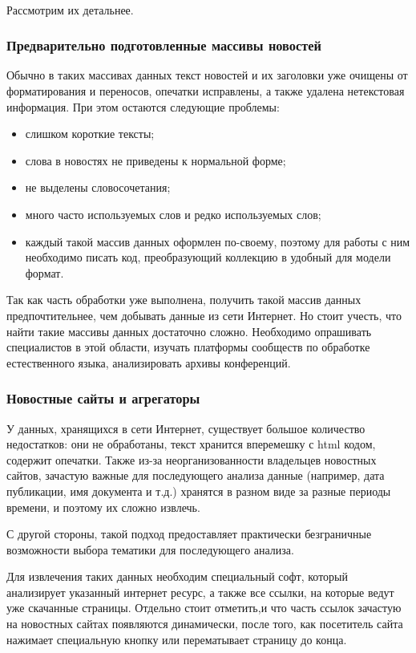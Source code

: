 ~\

Рассмотрим их детальнее. 

%
\subsubsection{Предварительно подготовленные массивы новостей}

Обычно в таких массивах данных текст новостей и их заголовки уже очищены от форматирования и переносов, опечатки исправлены, а также удалена нетекстовая информация. При этом остаются следующие проблемы:

\begin{itemize}
    \item слишком короткие тексты;
    \item слова в новостях не приведены к нормальной форме;
    \item не выделены словосочетания;
    \item много часто используемых слов и редко используемых слов;
    \item каждый такой массив данных оформлен по-своему, поэтому для работы с ним необходимо писать код, преобразующий коллекцию в удобный для модели формат.
\end{itemize}
 

Так как часть обработки уже выполнена, получить такой массив данных предпочтительнее, чем добывать данные из сети Интернет. Но стоит учесть, что найти такие массивы данных достаточно сложно. Необходимо опрашивать специалистов в этой области, изучать платформы сообществ по обработке естественного языка, анализировать архивы конференций.

%
\subsubsection{Новостные сайты и агрегаторы}

У данных, хранящихся в сети Интернет, существует большое количество недостатков: они не обработаны, текст хранится вперемешку с html кодом, содержит опечатки. Также из-за неорганизованности владельцев новостных сайтов, зачастую важные для последующего анализа данные (например, дата публикации, имя документа и т.д.) хранятся в разном виде за разные периоды времени, и поэтому их сложно извлечь. 

С другой стороны, такой подход предоставляет практически безграничные возможности выбора тематики для последующего анализа.

Для извлечения таких данных необходим специальный софт, который анализирует указанный интернет ресурс, а также все ссылки, на которые ведут уже скачанные страницы. Отдельно стоит отметить,и что часть ссылок зачастую на новостных сайтах появляются динамически, после того, как посетитель сайта нажимает специальную кнопку или перематывает страницу до конца.

